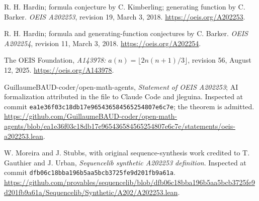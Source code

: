 R. H. Hardin; formula conjecture by C. Kimberling; generating function
by C. Barker. \emph{OEIS A202253}, revision 19, March 3, 2018.
\url{https://oeis.org/A202253}.

R. H. Hardin; formula and generating-function conjectures by C. Barker.
\emph{OEIS A202254}, revision 11, March 3, 2018.
\url{https://oeis.org/A202254}.

The OEIS Foundation, \emph{A143978: $a(n)=\lfloor2n(n+1)/3\rfloor$},
revision 56, August 12, 2025. \url{https://oeis.org/A143978}.

GuillaumeBAUD-coder/open-math-agents, \emph{Statement of OEIS A202253};
AI formalization attributed in the file to Claude Code and jleguina.
Inspected at commit \texttt{ea1e36f03c18db17e965436584565254807e6c7e};
the theorem is admitted.
\url{https://github.com/GuillaumeBAUD-coder/open-math-agents/blob/ea1e36f03c18db17e965436584565254807e6c7e/statements/oeis-a202253.lean}.

W. Moreira and J. Stubbs, with original sequence-synthesis work credited
to T. Gauthier and J. Urban, \emph{Sequencelib synthetic A202253 definition}.
Inspected at commit \texttt{dfb06c18bba196b5aa5bcb3725fe9d201fb9a61a}.
\url{https://github.com/provables/sequencelib/blob/dfb06c18bba196b5aa5bcb3725fe9d201fb9a61a/Sequencelib/Synthetic/A202/A202253.lean}.
